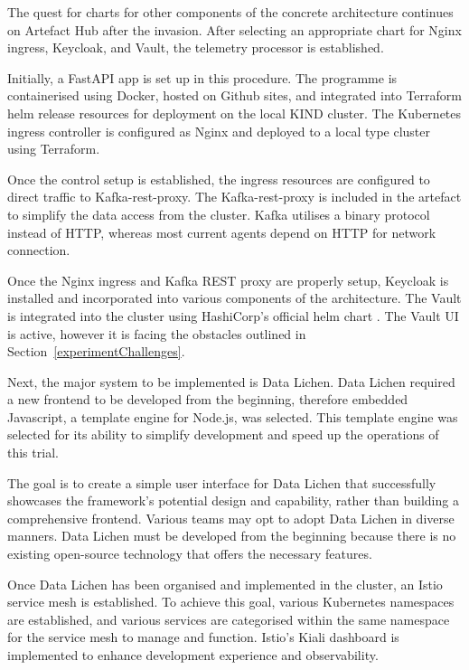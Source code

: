 \documentclass[preprint,12pt]{elsarticle}
\begin{document}
The quest for charts for other components of the concrete architecture continues on Artefact Hub after the invasion. After selecting an appropriate chart for Nginx ingress, Keycloak, and Vault, the telemetry processor is established. 

Initially, a FastAPI app is set up in this procedure. The programme is containerised using Docker, hosted on Github sites, and integrated into Terraform helm release resources for deployment on the local KIND cluster. The Kubernetes ingress controller is configured as Nginx and deployed to a local type cluster using Terraform. 

Once the control setup is established, the ingress resources are configured to direct traffic to Kafka-rest-proxy. The Kafka-rest-proxy is included in the artefact to simplify the data access from the cluster. Kafka utilises a binary protocol instead of HTTP, whereas most current agents depend on HTTP for network connection. 


Once the Nginx ingress and Kafka REST proxy are properly setup, Keycloak is installed and incorporated into various components of the architecture. The Vault is integrated into the cluster using HashiCorp's official helm chart \cite{HashiCorpVaultHelm2023}. The Vault UI is active, however it is facing the obstacles outlined in Section~\ref{experimentChallenges}. 

Next, the major system to be implemented is Data Lichen. Data Lichen required a new frontend to be developed from the beginning, therefore embedded Javascript, a template engine for Node.js, was selected. This template engine was selected for its ability to simplify development and speed up the operations of this trial. 

The goal is to create a simple user interface for Data Lichen that successfully showcases the framework's potential design and capability, rather than building a comprehensive frontend. Various teams may opt to adopt Data Lichen in diverse manners. Data Lichen must be developed from the beginning because there is no existing open-source technology that offers the necessary features.

Once Data Lichen has been organised and implemented in the cluster, an Istio service mesh is established. To achieve this goal, various Kubernetes namespaces are established, and various services are categorised within the same namespace for the service mesh to manage and function. Istio's Kiali dashboard is implemented to enhance development experience and observability. 
\end{document}
